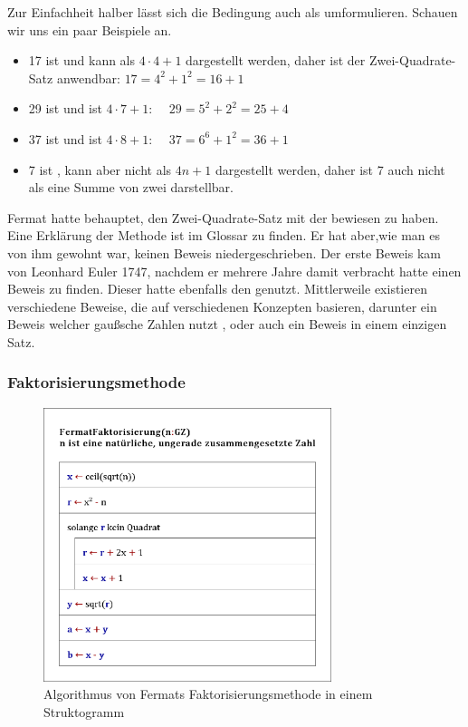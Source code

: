 Zur Einfachheit halber lässt sich die Bedingung  auch als  umformulieren. Schauen wir uns ein paar Beispiele an.

\begin{itemize}
    \item 17 ist  und kann als $4 \cdot 4 + 1$ dargestellt werden, daher ist der Zwei-Quadrate-Satz anwendbar: $17 = 4^2 + 1^2 = 16 + 1$
    \item 29 ist  und ist $4 \cdot 7 + 1$: $\quad 29 = 5^2 + 2^2 = 25 + 4$
    \item 37 ist  und ist $4 \cdot 8 + 1$: $\quad 37 = 6^6 + 1^2 = 36 + 1$
    \item 7 ist , kann aber nicht als $4n + 1$ dargestellt werden, daher ist 7 auch nicht als eine Summe von zwei  darstellbar.
\end{itemize}

Fermat hatte behauptet, den Zwei-Quadrate-Satz mit der  bewiesen zu haben. Eine Erklärung der Methode ist im Glossar zu finden. Er hat aber,wie man es von ihm gewohnt war, keinen Beweis niedergeschrieben. Der erste Beweis kam von Leonhard Euler 1747, nachdem er mehrere Jahre damit verbracht hatte einen Beweis zu finden. Dieser hatte ebenfalls den  genutzt.
Mittlerweile existieren verschiedene Beweise, die auf verschiedenen Konzepten basieren, darunter ein Beweis welcher gaußsche Zahlen nutzt \cite{woodbury}, oder auch ein Beweis in einem einzigen Satz. \cite{zagier}

\subsubsection{Faktorisierungsmethode} \label{sec:faktorMethode}

\begin{figure}[htb]
    \centering
    \includegraphics[width=0.75\textwidth]{img/factor_algorithm.png}
    \caption{Algorithmus von Fermats Faktorisierungsmethode in einem Struktogramm}
    \label{fig:factorAlgorithm}
\end{figure}

